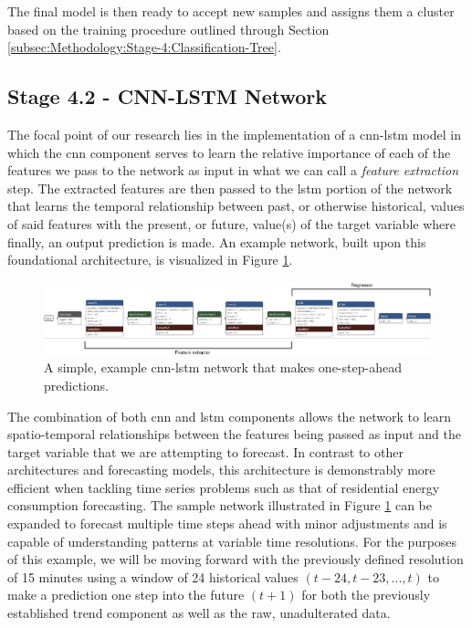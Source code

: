 \noindent \newline The final model is then ready to accept new samples and assigns them a cluster based on the training procedure outlined through Section \ref{subsec:Methodology:Stage-4:Classification-Tree}.

\clearpage

\subsection{Stage 4.2 - CNN-LSTM Network}
\label{subsec:Methodology:Stage-4:CNN-LSTM-Network}
The focal point of our research lies in the implementation of  a \gls{cnn-lstm} model in which the \gls{cnn} component serves to learn the relative importance of each of the features we pass to the network as input in what we can call a \textit{feature extraction} step. The extracted features are then passed to the \gls{lstm} portion of the network that learns the temporal relationship between past, or otherwise historical, values of said features with the present, or future, value(s) of the target variable where finally, an output prediction is made. An example network, built upon this foundational architecture, is visualized in Figure \ref{fig:UCID-CNN-LSTM-Model}.

\begin{figure}[hbt!]
    \begin{adjustwidth}{-4.5cm}{-4.5cm}%
        \centering
        \includegraphics[width=\linewidth]{Images/Chapter 6/Stage 4/UCID/UCID-CNN-LSTM-Model.pdf}
        \caption{A simple, example \gls{cnn-lstm} network that makes one-step-ahead predictions.}
        \label{fig:UCID-CNN-LSTM-Model}
    \end{adjustwidth}
\end{figure}

\noindent \newline The combination of both \gls{cnn} and \gls{lstm} components allows the network to learn spatio-temporal relationships between the features being passed as input and the target variable that we are attempting to forecast. In contrast to other architectures and forecasting models, this architecture is demonstrably more efficient \cite{Kim} when tackling time series problems such as that of residential energy consumption forecasting. The sample network illustrated in Figure \ref{fig:UCID-CNN-LSTM-Model} can be expanded to forecast multiple time steps ahead with minor adjustments and is capable of understanding patterns at variable time resolutions. For the purposes of this example, we will be moving forward with the previously defined resolution of 15 minutes using a window of 24 historical values $(t - 24, t - 23, ..., t)$ to make a prediction one step into the future $(t + 1)$ for both the previously established trend component as well as the raw, unadulterated data.

